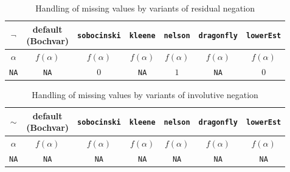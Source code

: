 \documentclass[review]{elsarticle}
\newcommand{\code}[1]{\texttt{#1}}
\begin{document}
\begin{table}
    \centering
    \caption{Handling of missing values by variants of residual negation}
    \label{tab:res-negation}
    \begin{tabular}{c|cccccc}
        $\lnot$     & \makecell{default \\ (Bochvar)} & \texttt{sobocinski} & \texttt{kleene} & \texttt{nelson} & \texttt{dragonfly} & \texttt{lowerEst} \\
        \hline
        $\alpha$    & $f(\alpha)$ & $f(\alpha)$ & $f(\alpha)$ & $f(\alpha)$ & $f(\alpha)$ & $f(\alpha)$ \\
        \code{NA} & \code{NA} & $0$         & \code{NA} & $1$         & \code{NA} & $0$
    \end{tabular}
\end{table}

\begin{table}
    \centering
    \caption{Handling of missing values by variants of involutive negation}
    \label{tab:inv-negation}
    \begin{tabular}{c|cccccc}
        $\sim$     & \makecell{default \\ (Bochvar)} & \texttt{sobocinski} & \texttt{kleene} & \texttt{nelson} & \texttt{dragonfly} & \texttt{lowerEst} \\
        \hline
        $\alpha$    & $f(\alpha)$ & $f(\alpha)$ & $f(\alpha)$ & $f(\alpha)$ & $f(\alpha)$ & $f(\alpha)$ \\
        \code{NA} & \code{NA} & \code{NA} & \code{NA} & \code{NA} & \code{NA} & \code{NA}
    \end{tabular}
\end{table}
\end{document}
